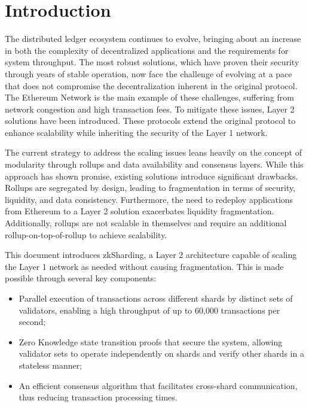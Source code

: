 \section{Introduction}
\label{section:introduction}

The distributed ledger ecosystem continues to evolve,
 bringing about an increase in both the complexity of decentralized applications
 and the requirements for system throughput. 
The most robust solutions, which have proven their security through years of stable operation, 
 now face the challenge of evolving at a pace 
 that does not compromise the decentralization 
 inherent in the original protocol.
The Ethereum Network is the main example of these challenges,
 suffering from network congestion and high transaction fees. 
To mitigate these issues, Layer 2 solutions have been introduced.
These protocols extend the original protocol to enhance scalability 
 while inheriting the security of the Layer 1 network.

 The current strategy to address the scaling issues leans heavily on the
 concept of modularity through rollups and data availability and consensus layers.
While this approach has shown promise, existing solutions introduce significant drawbacks.
Rollups are segregated by design, 
 leading to fragmentation in terms of security, liquidity, and data consistency.
Furthermore, the need to redeploy applications from Ethereum to a Layer 2 solution
 exacerbates liquidity fragmentation. 
Additionally, rollups are not scalable in themselves 
 and require an additional rollup-on-top-of-rollup to achieve scalability. 

This document introduces zkSharding, 
 a Layer 2 architecture capable of scaling the Layer 1 network as needed 
 without causing fragmentation. 
This is made possible through several key components:
\begin{itemize}
    \item Parallel execution of transactions across different shards 
     by distinct sets of validators, 
     enabling a high throughput of up to 60,000 transactions per second; 
    \item Zero Knowledge state transition proofs that secure the system, 
     allowing validator sets to operate independently on shards 
     and verify other shards in a stateless manner; 
    \item An efficient consensus algorithm that facilitates cross-shard communication, 
     thus reducing transaction processing times. 
\end{itemize}

